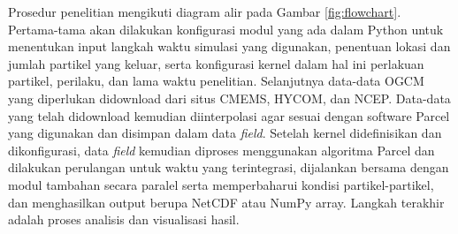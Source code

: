 \begin{spacing}{1.5}
	Prosedur penelitian mengikuti diagram alir pada Gambar \ref{fig:flowchart}. Pertama-tama akan dilakukan konfigurasi modul yang ada dalam Python untuk menentukan input langkah waktu simulasi yang digunakan, penentuan lokasi dan  jumlah partikel yang keluar, serta konfigurasi kernel dalam hal ini perlakuan partikel, perilaku, dan lama waktu penelitian. Selanjutnya data-data OGCM yang diperlukan didownload dari situs CMEMS, HYCOM, dan NCEP. Data-data yang telah didownload kemudian diinterpolasi agar sesuai dengan software Parcel yang digunakan dan disimpan dalam data \textit{field}. Setelah kernel didefinisikan dan dikonfigurasi, data \textit{field} kemudian diproses menggunakan algoritma Parcel dan dilakukan perulangan untuk waktu yang terintegrasi, dijalankan bersama dengan modul tambahan secara paralel serta memperbaharui kondisi partikel-partikel, dan menghasilkan output berupa NetCDF atau NumPy array. Langkah terakhir adalah proses analisis dan visualisasi hasil.
\end{spacing}